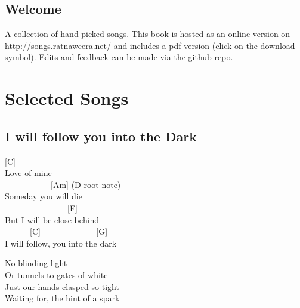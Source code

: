 \documentclass[
  letterpaper,
  twoside=false]{scrbook}
\renewcommand*\contentsname{Table of contents}
\newcommand\contentsname{Table of contents}
\begin{document}
\renewcommand*\contentsname{Table of contents}
{
\setcounter{tocdepth}{2}
\tableofcontents
}
\mainmatter
{}

\hypertarget{title}{%
\chapter*{Welcome}\label{title}}


A collection of hand picked songs. This book is hosted as an online
version on \url{http://songs.ratnaweera.net/} and includes a pdf version
(click on the download symbol). Edits and feedback can be made via the
\href{https://github.com/ratnanil/songs}{github repo}.

\part{Selected Songs}

\hypertarget{i-will-follow-you-into-the-dark}{%
\chapter{I will follow you into the
Dark}\label{i-will-follow-you-into-the-dark}}

{[}C{]}\\
Love of mine\\
\hspace*{0.333em} ~ ~ ~ ~ ~ ~ ~{[}Am{]} (D root note)\\
Someday you will die\\
\hspace*{0.333em} ~ ~ ~ ~ ~ ~ ~ ~ ~ {[}F{]}\\
But I will be close behind\\
\hspace*{0.333em} ~ ~ ~ ~{[}C{]} ~ ~ ~ ~ ~ ~ ~ ~{[}G{]}\\
I will follow, you into the dark

No blinding light\\
Or tunnels to gates of white\\
Just our hands clasped so tight\\
Waiting for, the hint of a spark
\end{document}
